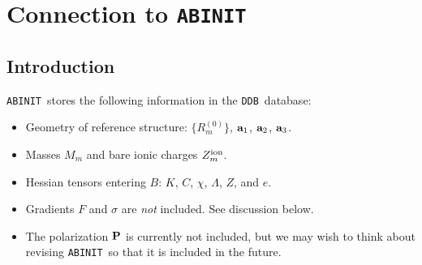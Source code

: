 \documentclass[11pt,fleqn]{article}
\def\P{{\bf P}}
\def\ABINIT{{{\tt ABINIT}}}
\def\DDB{{\tt DDB}}
\begin{document}
% 
% 

\section{Connection to \ABINIT}
\label{sec:abinit}

\subsection{Introduction}
\label{sec:ab-intro}

\ABINIT\ stores the following information in the
\DDB\ database:
%
\begin{itemize}
\item Geometry of reference structure: $\{R_m^{(0)}\}$,
${\bf a}_1$, ${\bf a}_2$, ${\bf a}_3$.
\item Masses $M_m$ and bare ionic charges $Z_m^{\rm ion}$.
\item Hessian tensors entering $B$: $K$, $C$, $\chi$, $\Lambda$, $Z$, and $e$.
\item Gradients $F$ and $\sigma$ are {\it not} included.  See
  discussion below.
\item The polarization $\P$ is currently not included, but
  we may wish to think about revising \ABINIT\ so that it is
  included in the future.
\end{itemize}
\end{document}
